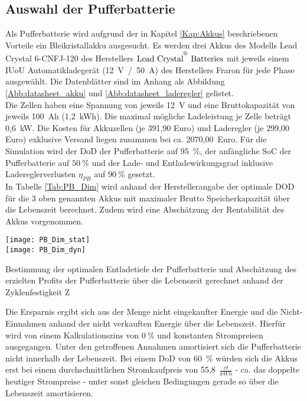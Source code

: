     \subsection{Auswahl der Pufferbatterie}
    		Als Pufferbatterie wird aufgrund der in Kapitel \ref{Kap:Akkus} beschriebenen Vorteile ein Bleikristallakku ausgesucht. Es werden drei Akkus des Modells Lead Crystal 6-CNFJ-120 des Herstellers  $\text{Lead Crystal}^{\textsuperscript{\textregistered}} ~\text{Batteries}$ mit jeweils einem IUoU Automatikladegerät (12~V~/~50~A) des Herstellers Fraron für jede Phase ausgewählt. Die Datenblätter sind im Anhang als Abbildung \ref{Abb:datasheet_akku} und \ref{Abb:datasheet_laderegler} gelistet. \\
        
        Die Zellen haben eine Spannung von jeweils 12~V und eine Bruttokapazität von jeweils 100~Ah (1,2~kWh). Die maximal mögliche Ladeleistung je Zelle beträgt 0,6~kW. Die Kosten für Akkuzellen (je 391,90 Euro) und Laderegler (je 299,00 Euro) exklusive Versand liegen zusammen bei ca. 2070,00~Euro. Für die Simulation wird der DoD der Pufferbatterie auf 95~$\%$, der anfängliche SoC der Pufferbatterie auf $50~\%$ und der Lade- und Entladewirkungsgrad inklusive Ladereglerverlusten $\eta_{PB}$ auf $90~\%$ gesetzt.\\
        
        In Tabelle \ref{Tab:PB_Dim} wird anhand der Herstellerangabe der optimale DOD für die 3 oben genannten Akkus mit maximaler Brutto Speicherkapazität über die Lebenszeit berechnet. Zudem wird eine Abschätzung der Rentabilität des Akkus vorgenommen. \\ 
       
        \begin{table}[h]
          \centering
          \texttt{[image: PB\_Dim\_stat]} \\
          \texttt{[image: PB\_Dim\_dyn]}         
          \caption{Bestimmung der optimalen Entladetiefe der Pufferbatterie und Abschätzung des erzielten Profits der Pufferbatterie über die Lebenszeit gerechnet anhand der Zyklenfestigkeit Z}
          \label{Tab:PB_Dim}        
        \end{table}    

		Die Ersparnis ergibt sich aus der Menge nicht eingekaufter Energie und die Nicht-Einnahmen anhand der nicht verkauften Energie über die Lebenszeit. Hierfür wird von einem Kalkulationszins von $0~\%$ und konstanten Strompreisen ausgegangen. Unter den getroffenen Annahmen amortisiert sich die Pufferbatterie nicht innerhalb der Lebenszeit. Bei einem DoD von 60~$\%$ würden sich die Akkus erst bei einem durchschnittlichen Stromkaufpreis von 55,8~$\frac{ct}{kWh}$ - ca. das doppelte heutiger Strompreise - unter sonst gleichen Bedingungen gerade so über die Lebenszeit amortisieren. \\
        

